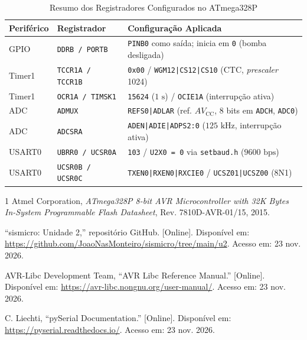 \documentclass[conference]{IEEEtran}
\begin{document}
\begin{table}[htbp]
	\caption{Resumo dos Registradores Configurados no ATmega328P}
	\label{tab:registradores}
	\centering
	\footnotesize
	\setlength{\tabcolsep}{3pt}
	\begin{tabularx}{\columnwidth}{@{}ll>{\raggedright\arraybackslash}X@{}}
		\toprule
		\textbf{Periférico} & \textbf{Registrador}     & \textbf{Configuração Aplicada}                                                       \\
		\midrule
		GPIO                & \texttt{DDRB / PORTB}    & \texttt{PINB0} como saída; inicia em \texttt{0} (bomba desligada)                    \\
		Timer1              & \texttt{TCCR1A / TCCR1B} & \texttt{0x00} / \texttt{WGM12|CS12|CS10} (CTC, \textit{prescaler} 1024)              \\
		Timer1              & \texttt{OCR1A / TIMSK1}  & \texttt{15624} ($1\text{ s}$) / \texttt{OCIE1A} (interrupção ativa)                  \\
		ADC                 & \texttt{ADMUX}           & \texttt{REFS0|ADLAR} (ref. $AV_{\text{CC}}$, 8 bits em \texttt{ADCH}, \texttt{ADC0}) \\
		ADC                 & \texttt{ADCSRA}          & \texttt{ADEN|ADIE|ADPS2:0} ($125\text{ kHz}$, interrupção ativa)                     \\
		USART0              & \texttt{UBRR0 / UCSR0A}  & \texttt{103} / \texttt{U2X0 = 0} via \texttt{setbaud.h} ($9600\text{ bps}$)          \\
		USART0              & \texttt{UCSR0B / UCSR0C} & \texttt{TXEN0|RXEN0|RXCIE0} / \texttt{UCSZ01|UCSZ00} (8N1)                           \\
		\bottomrule
	\end{tabularx}
\end{table}

\begin{thebibliography}{1}
	Atmel Corporation, \textit{ATmega328P 8-bit AVR Microcontroller with 32K Bytes In-System Programmable Flash Datasheet}, Rev. 7810D-AVR-01/15, 2015.

	``sismicro: Unidade 2,'' repositório GitHub. [Online]. Disponível em: \url{https://github.com/JoaoNasMonteiro/sismicro/tree/main/u2}. Acesso em: 23 nov. 2026.

	AVR-Libc Development Team, ``AVR Libc Reference Manual.'' [Online]. Disponível em: \url{https://avr-libc.nongnu.org/user-manual/}. Acesso em: 23 nov. 2026.

	C. Liechti, ``pySerial Documentation.'' [Online]. Disponível em: \url{https://pyserial.readthedocs.io/}. Acesso em: 23 nov. 2026.
\end{thebibliography}
\end{document}
